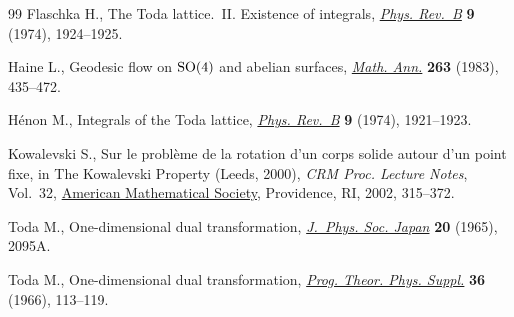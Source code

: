 \documentclass[10pt,a4paper]{amsart}
\numberwithin{equation}{section}
\begin{document}
\begin{thebibliography}{99}
Flaschka H., The {T}oda lattice.~{II}. {E}xistence of integrals, \href{https://doi.org/10.1103/PhysRevB.9.1924}{\textit{Phys.
 Rev.~B}} \textbf{9} (1974), 1924--1925.

Haine L., Geodesic flow on {${\rm SO}(4)$} and abelian surfaces, \href{https://doi.org/10.1007/BF01457053}{\textit{Math.
 Ann.}} \textbf{263} (1983), 435--472.

H\'enon M., Integrals of the {T}oda lattice, \href{https://doi.org/10.1103/PhysRevB.9.1921}{\textit{Phys. Rev.~B}} \textbf{9}
 (1974), 1921--1923.

Kowalevski S., Sur le probl\`eme de la rotation d'un corps solide autour d'un
 point fixe, in The {K}owalevski {P}roperty ({L}eeds, 2000), \textit{CRM Proc.
 Lecture Notes}, Vol.~32, \href{https://doi.org/10.1090/crmp/032/18}{American Mathematical Society}, Providence, RI, 2002,
 315--372.

Toda M., One-dimensional dual transformation, \href{https://doi.org/10.1143/JPSJ.20.2095A}{\textit{J.~Phys. Soc. Japan}}
 \textbf{20} (1965), 2095A.

Toda M., One-dimensional dual transformation, \href{https://doi.org/10.1143/PTPS.36.113}{\textit{Prog. Theor. Phys.
 Suppl.}} \textbf{36} (1966), 113--119.

\end{thebibliography}
\end{document}
